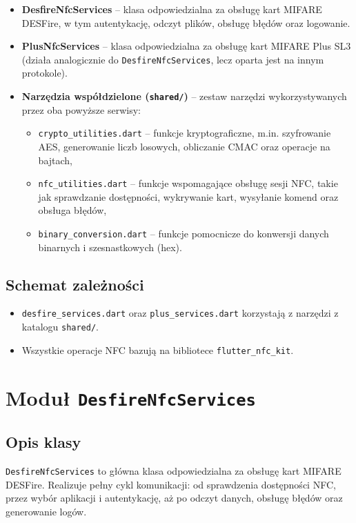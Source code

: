 \documentclass[a4paper,12pt]{article}
\begin{document}
\begin{itemize}
    \item \textbf{DesfireNfcServices} – klasa odpowiedzialna za obsługę kart MIFARE DESFire, w tym autentykację, odczyt plików, obsługę błędów oraz logowanie.
    
    \item \textbf{PlusNfcServices} – klasa odpowiedzialna za obsługę kart MIFARE Plus SL3 (działa analogicznie do \texttt{DesfireNfcServices}, lecz oparta jest na innym protokole).
    
    \item \textbf{Narzędzia współdzielone (\texttt{shared/})} – zestaw narzędzi wykorzystywanych przez oba powyższe serwisy:
    \begin{itemize}
        \item \texttt{crypto\_utilities.dart} – funkcje kryptograficzne, m.in. szyfrowanie AES, generowanie liczb losowych, obliczanie CMAC oraz operacje na bajtach,
        \item \texttt{nfc\_utilities.dart} – funkcje wspomagające obsługę sesji NFC, takie jak sprawdzanie dostępności, wykrywanie kart, wysyłanie komend oraz obsługa błędów,
        \item \texttt{binary\_conversion.dart} – funkcje pomocnicze do konwersji danych binarnych i szesnastkowych (hex).
    \end{itemize}
    
\end{itemize}

\subsection{Schemat zależności}
\begin{itemize}
    \item \texttt{desfire\_services.dart} oraz \texttt{plus\_services.dart} korzystają z narzędzi z katalogu \texttt{shared/}.
    \item Wszystkie operacje NFC bazują na bibliotece \texttt{flutter\_nfc\_kit}.
\end{itemize}

\section{Moduł \texttt{DesfireNfcServices}}

\subsection{Opis klasy}
\texttt{DesfireNfcServices} to główna klasa odpowiedzialna za obsługę kart MIFARE DESFire. Realizuje pełny cykl komunikacji: od sprawdzenia dostępności NFC, przez wybór aplikacji i autentykację, aż po odczyt danych, obsługę błędów oraz generowanie logów.
\end{document}
